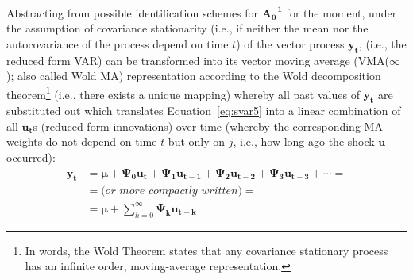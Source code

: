 \documentclass[a4paper,11pt,listof=nochaptergap,oneside,pointednumbers,bibtotoc,bigheadings,liststotoc]{scrbook}
\theoremstyle{mysatz}
\theoremstyle{mydefinition}
\theoremstyle{mybemerkung}
\newcommand{\vect}[1]{\boldsymbol{\mathbf{#1}}}
\begin{document}
\\
Abstracting from possible identification schemes for $\vect{A_0^{-1}}$ for the moment, under the assumption of covariance stationarity (i.e., if neither the mean nor the autocovariance of the process depend on time $t$) of the vector process $\vect{y_t}$, \vect{y_t} (i.e., the reduced form VAR) can be transformed into its vector moving average (VMA($\infty$); also called Wold MA) representation according to the Wold decomposition theorem\footnote{In words, the Wold Theorem states that any covariance stationary process has an infinite order, moving-average representation.} (i.e., there exists a unique mapping) whereby all past values of $\vect{y_t}$ are substituted out which translates Equation~\ref{eq:svar5} into a linear combination of all $\vect{u_t}$s (reduced-form innovations) over time (whereby the corresponding MA-weights do not depend on time $t$ but only on $j$, i.e., how long ago the shock $\vect{u}$ occurred):
\begin{equation} \label{eq:svar7}
\begin{split}
 			\vect{y_t} & = \vect{\mu} + \vect{\Psi_0}\vect{u_t} + \vect{\Psi_1}\vect{u_{t-1}} + \vect{\Psi_{2}}\vect{u_{t-2}} + \vect{\Psi_{3}}\vect{u_{t-3}} + \cdots = \\
			& = \textit{(or more compactly written)} = \\
			& = \vect{\mu} + \sum\limits_{k=0}^\infty \vect{\Psi_k}\vect{u_{t-k}}
\end{split}								
\end{equation}
\end{document}
